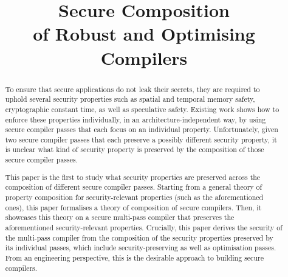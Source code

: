 \documentclass[dvipsnames,conference]{IEEEtran}
\theoremstyle{definition}
\begin{document}
\linenumbers

\title{Secure Composition \\ of Robust and Optimising Compilers}

\author{}

\maketitle

\begin{abstract}
To ensure that secure applications do not leak their secrets, they are required to uphold several security properties such as spatial and temporal memory safety, cryptographic constant time, as well as speculative safety.
Existing work shows how to enforce these properties individually, in an architecture-independent way, by using secure compiler passes that each focus on an individual property.
Unfortunately, given two secure compiler passes that each preserve a possibly different security property, it is unclear what kind of security property is preserved by the composition of those secure compiler passes.

This paper is the first to study what security properties are preserved across the composition of different secure compiler passes.
Starting from a general theory of property composition for security-relevant properties (such as the aforementioned ones), this paper formalises a theory of composition of secure compilers.
Then, it showcases this theory on a secure multi-pass compiler that preserves the aforementioned security-relevant properties.
Crucially, this paper derives the security of the multi-pass compiler from the composition of the security properties preserved by its individual passes, which include security-preserving as well as optimisation passes.
% 
From an engineering perspective, this is the desirable approach to building secure compilers.



\end{abstract}
\end{document}

